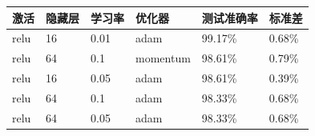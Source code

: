 \begin{tabular}{llllll}
\toprule
激活 & 隐藏层 & 学习率 & 优化器 & 测试准确率 & 标准差 \\
\midrule
relu & 16 & 0.01 & adam & 99.17\% & 0.68\% \\
relu & 64 & 0.1 & momentum & 98.61\% & 0.79\% \\
relu & 16 & 0.05 & adam & 98.61\% & 0.39\% \\
relu & 64 & 0.1 & adam & 98.33\% & 0.68\% \\
relu & 64 & 0.05 & adam & 98.33\% & 0.68\% \\
\bottomrule
\end{tabular}
